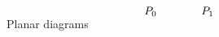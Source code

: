 \documentclass[10pt]{amsart}
\theoremstyle{break}
\begin{document}
\begin{figure}[hbt]
\begin{equation*}

\unitlength 0.1in
\begin{picture}(3.00,5.00)(2.00,-6.00)
\special{pn 8}\special{pa 500 500}\special{pa 474 473}\special{pa 449 447}\special{pa 428 420}\special{pa 411 393}\special{pa 402 367}\special{pa 401 340}\special{pa 408 314}\special{pa 423 287}\special{pa 443 260}\special{pa 467 234}\special{pa 493 207}\special{pa 500 200}\special{sp}\special{pn 8}\special{pa 200 500}\special{pa 226 473}\special{pa 251 447}\special{pa 272 420}\special{pa 289 393}\special{pa 298 367}\special{pa 299 340}\special{pa 292 314}\special{pa 277 287}\special{pa 257 260}\special{pa 233 234}\special{pa 207 207}\special{pa 200 200}\special{sp}\special{pn 8}\special{pa 490 210}\special{pa 500 200}\special{fp}\special{sh 1}\special{pa 500 200}\special{pa 439 233}\special{pa 462 238}\special{pa 467 261}\special{pa 500 200}\special{fp}\special{pa 210 210}\special{pa 200 200}\special{fp}\special{sh 1}\special{pa 200 200}\special{pa 233 261}\special{pa 238 238}\special{pa 261 233}\special{pa 200 200}\special{fp}\put(3.500,-7.0000){\makebox(0,0){$P_0$}}\end{picture}
\hspace{1cm}
\unitlength 0.1in
\begin{picture}(3.00,5.00)(2.00,-6.00)
\special{pn 8}\special{ar -1917 200 2388 95  6.2831853 6.2831853}\special{ar -1917 200 2388 95  0.0000000 0.3210887}\special{pn 8}\special{ar -1918 500 2389 95  5.9622286 6.2831853}\special{pn 8}\special{ar 2640 500 2412 95  3.1415927 3.4628191}\special{pn 8}\special{ar 2640 200 2412 95  2.8203662 3.1415927}\special{pn 8}\special{pa 322 475}\special{pa 344 470}\special{fp}\special{sh 1}\special{pa 344 470}\special{pa 275 465}\special{pa 292 482}\special{pa 283 504}\special{pa 344 470}\special{fp}\special{pn 8}\special{pa 367 475}\special{pa 344 470}\special{fp}\special{sh 1}\special{pa 344 470}\special{pa 405 504}\special{pa 396 481}\special{pa 413 465}\special{pa 344 470}\special{fp}\special{pn 8}\special{pa 222 205}\special{pa 200 200}\special{fp}\special{sh 1}\special{pa 200 200}\special{pa 261 234}\special{pa 252 212}\special{pa 269 195}\special{pa 200 200}\special{fp}\special{pn 8}\special{pa 478 205}\special{pa 500 200}\special{fp}\special{sh 1}\special{pa 500 200}\special{pa 431 195}\special{pa 448 212}\special{pa 439 234}\special{pa 500 200}\special{fp}\special{pn 8}\special{pa 340 470}\special{pa 340 230}\special{fp}\special{pn 8}\special{pa 360 470}\special{pa 360 230}\special{fp}\put(3.500,-7.0000){\makebox(0,0){$P_1$}}\end{picture}

\end{equation*}
\caption{Planar diagrams}
\end{figure}
\end{document}
